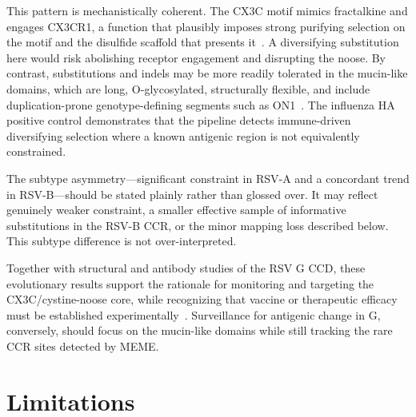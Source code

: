 \documentclass[11pt]{article}
\begin{document}
This pattern is mechanistically coherent. The CX3C motif mimics fractalkine and engages CX3CR1, a function that plausibly imposes strong purifying selection on the motif and the disulfide scaffold that presents it~\cite{tripp2001,pdb5wn9,anderson2021}. A diversifying substitution here would risk abolishing receptor engagement and disrupting the noose. By contrast, substitutions and indels may be more readily tolerated in the mucin-like domains, which are long, O-glycosylated, structurally flexible, and include duplication-prone genotype-defining segments such as ON1~\cite{eshaghi2012,anderson2021}. The influenza HA positive control demonstrates that the pipeline detects immune-driven diversifying selection where a known antigenic region is not equivalently constrained.

The subtype asymmetry---significant constraint in RSV-A and a concordant trend in RSV-B---should be stated plainly rather than glossed over. It may reflect genuinely weaker constraint, a smaller effective sample of informative substitutions in the RSV-B CCR, or the minor mapping loss described below. This subtype difference is not over-interpreted.

Together with structural and antibody studies of the RSV G CCD, these evolutionary results support the rationale for monitoring and targeting the CX3C/cystine-noose core, while recognizing that vaccine or therapeutic efficacy must be established experimentally~\cite{pdb5wn9,rainho2022,lee2018}. Surveillance for antigenic change in G, conversely, should focus on the mucin-like domains while still tracking the rare CCR sites detected by MEME.

\section{Limitations}
\end{document}
